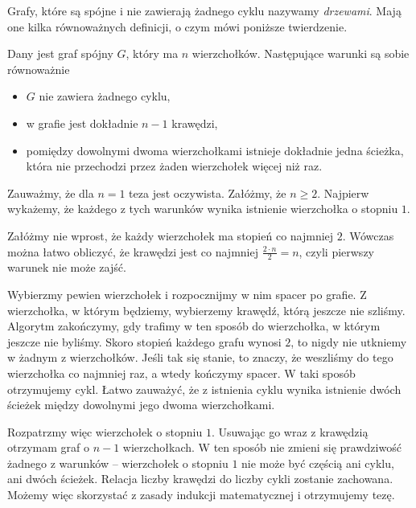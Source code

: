 \vspace{10px}

\noindent
Grafy, które są spójne i nie zawierają żadnego cyklu nazywamy \textit{drzewami}. Mają one kilka równoważnych definicji, o czym mówi poniższe twierdzenie.

\vspace{5px}


\noindent
Dany jest graf spójny $G$, który ma $n$ wierzchołków. Następujące warunki są sobie równoważnie
\begin{itemize}
    \item $G$ nie zawiera żadnego cyklu,
    \item w grafie jest dokładnie $n - 1$ krawędzi,
    \item pomiędzy dowolnymi dwoma wierzchołkami istnieje dokładnie jedna ścieżka, która nie przechodzi przez żaden wierzchołek więcej niż raz.
\end{itemize}


\noindent
Zauważmy, że dla $n = 1$ teza jest oczywista. Załóżmy, że $n \geqslant 2$. Najpierw wykażemy, że każdego z tych warunków wynika istnienie wierzchołka o stopniu $1$.

\vspace{10 px}
\noindent
Załóżmy nie wprost, że każdy wierzchołek ma stopień co najmniej $2$. Wówczas można łatwo obliczyć, że krawędzi jest co najmniej $\frac{2 \cdot n}{2} = n$, czyli pierwszy warunek nie może zajść.

\vspace{10 px}
\noindent
Wybierzmy pewien wierzchołek i rozpocznijmy w nim spacer po grafie. Z wierzchołka, w którym będziemy, wybierzemy krawędź, którą jeszcze nie szliśmy. Algorytm zakończymy, gdy trafimy w ten sposób do wierzchołka, w którym jeszcze nie byliśmy. Skoro stopień każdego grafu wynosi $2$, to nigdy nie utkniemy w żadnym z wierzchołków. Jeśli tak się stanie, to znaczy, że weszliśmy do tego wierzchołka co najmniej raz, a wtedy kończymy spacer. W taki sposób otrzymujemy cykl. Łatwo zauważyć, że z istnienia cyklu wynika istnienie dwóch ścieżek między dowolnymi jego dwoma wierzchołkami.

\vspace{10 px}
\noindent
Rozpatrzmy więc wierzchołek o stopniu $1$. Usuwając go wraz z krawędzią otrzymam graf o $n - 1$ wierzchołkach. W ten sposób nie zmieni się prawdziwość żadnego z warunków -- wierzchołek o stopniu $1$ nie może być częścią ani cyklu, ani dwóch ścieżek. Relacja liczby krawędzi do liczby cykli zostanie zachowana. Możemy więc skorzystać z zasady indukcji matematycznej i otrzymujemy tezę.

